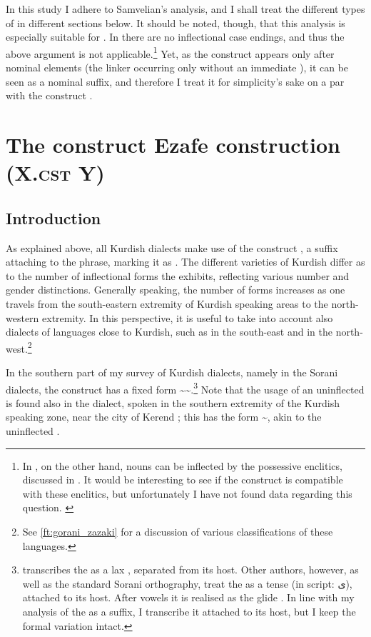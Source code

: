In this study I adhere to Samvelian's analysis, and I shall treat the different types of  \ez* in different sections below. It should be noted, though, that this analysis is especially suitable for \Kur. In \Sor there are no inflectional case endings, and thus the above argument is not applicable.\footnote{In \Sor, on the other hand, nouns can be inflected by the possessive enclitics, discussed in . It would be interesting to see if the construct \ez* is compatible with these enclitics, but unfortunately I have not found data regarding this question. \label{ft:sor_poss_infl}} Yet, as the \Sor construct \ez* appears only after nominal elements (the linker \ez* occurring only without an immediate \prim), it can be seen as a nominal suffix, and therefore I treat  it for simplicity's sake on a par with the \Kur construct \ez*.
 
 
\section{The construct Ezafe construction (X.\textsc{cst} Y)} \label{ss:Kurdish_cst}
\subsection{Introduction}
As explained above, all Kurdish dialects make use of the construct \ez*, a suffix attaching to the \prim phrase, marking it as \cst*. The different varieties of Kurdish differ as to the number of inflectional forms the \ez* exhibits, reflecting various number and gender distinctions. Generally speaking, the number of forms increases as one travels from the south-eastern extremity of Kurdish speaking areas to the north-western extremity. In this perspective, it is useful to take into account also dialects of languages close to Kurdish, such as  in the south-east and  in the north-west.\footnote{See \vref{ft:gorani_zazaki} for a discussion of various classifications of these languages.}

In the southern part of my survey of Kurdish dialects, namely in the Sorani dialects, the construct \ez* has a fixed form \~\~.\footnote{\citeauthor{ThackstonSorani} transcribes the \ez* as a lax , separated from its host. Other authors, however, as well as the standard Sorani  orthography, treat the \ez* as a tense  (in  script: \textarabic{ی}), attached to its host. After vowels it is realised as the glide . In line with my analysis of the \ez* as a suffix, I transcribe it attached to its host, but I keep the formal variation intact.} Note that the usage of an uninflected \ez* is found also in the \Gawr {} dialect, spoken in the southern extremity of the Kurdish speaking zone, near the city of Kerend \citep[16]{MahmoudveysiGawraju}; this \ez* has the form \~, akin to the uninflected \Per \ez* {}.

